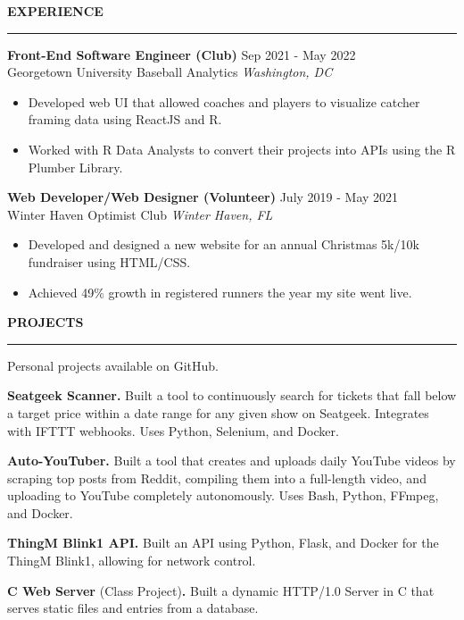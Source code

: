 \documentclass[10pt,letterpaper]{article}
\begin{document}
\medskip
\MakeUppercase{{\bf Experience}}
\medskip
\hrule
\begin{list}{}{\setlength{\leftmargin}{0em}}
    \item
          \textbf{Front-End Software Engineer (Club)} \hfill Sep 2021 - May 2022\\
          Georgetown University Baseball Analytics \hfill \textit{Washington, DC}
          \begin{itemize}
              \itemsep -3pt {}
              \item Developed web UI that allowed coaches and players to visualize catcher framing data using ReactJS and R. \
              \item Worked with R Data Analysts to convert their projects into APIs using the R Plumber Library.
          \end{itemize}

    \item
          \textbf{Web Developer/Web Designer (Volunteer)} \hfill July 2019 - May 2021\\
          Winter Haven Optimist Club \hfill \textit{Winter Haven, FL}
          \begin{itemize}
              \itemsep -3pt {}
              \item Developed and designed a new website for an annual Christmas 5k/10k fundraiser using HTML/CSS.
              \item Achieved 49\% growth in registered runners the year my site went live.
          \end{itemize}
\end{list}


\medskip
\MakeUppercase{{\bf Projects}}
\medskip
\hrule
\begin{list}{}{\setlength{\leftmargin}{0em}}
    \item
          \vspace{-1.25em}
    \item {Personal projects available on GitHub. }
    \item \textbf{Seatgeek Scanner.} {Built a tool to continuously search for tickets that fall below a target price within a date range for any given show on Seatgeek. Integrates with IFTTT webhooks. Uses Python, Selenium, and Docker. }
    \item \textbf{Auto-YouTuber.} {Built a tool that creates and uploads daily YouTube videos by scraping top posts from Reddit, compiling them into a full-length video, and uploading to YouTube completely autonomously. Uses Bash, Python, FFmpeg, and Docker. }
    \item \textbf{ThingM Blink1 API.} {Built an API using Python, Flask, and Docker for the ThingM Blink1, allowing for network control.}
    \item \textbf{C Web Server} {(Class Project)\textbf{.} Built a dynamic HTTP/1.0 Server in C that serves static files and entries from a database.}
\end{list}
\end{document}
